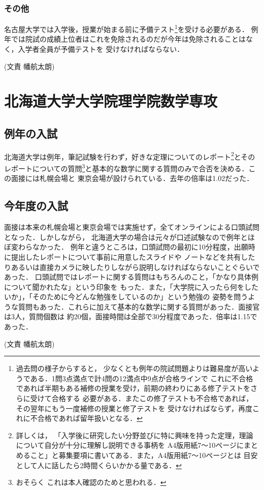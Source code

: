 \documentclass[uplatex]{jsarticle}
\begin{document}
	\subsubsection*{その他}
  名古屋大学では入学後，授業が始まる前に予備テスト\footnote{過去問の様子からすると，
  少なくとも例年の院試問題よりは難易度が高いようである．1問3点満点で計4問の12満点中9点が合格ラインで
  これに不合格であれば半期もある補修の授業を受け，前期の終わりにある修了テストをさらに受けて合格する
  必要がある．またこの修了テストも不合格であれば，その翌年にもう一度補修の授業と修了テストを
  受けなければならず，再度これに不合格であれば留年扱いとなる．}を受ける必要がある．
  例年では院試の成績上位者はこれを免除されるのだが今年は免除されることはなく，入学者全員が予備テストを
  受けなければならない．
  \begin{flushright}
    (文責 幡航太朗)
	\end{flushright}
	
	\newpage
	\section*{北海道大学大学院理学院数学専攻}
	\subsection*{例年の入試}
  北海道大学は例年，筆記試験を行わず，好きな定理についてのレポート\footnote{詳しくは，
  「入学後に研究したい分野並びに特に興味を持った定理，理論について自分が十分に理解し説明できる事柄を
  A4版用紙7～10ページにまとめること」と募集要項に書いてある．また，A4版用紙7～10ページとは
  目安として人に話したら2時間くらいかかる量である．}とそのレポートについての質問\footnote{おそらく
  これは本人確認のためと思われる．}と基本的な数学に関する質問のみで合否を決める．この面接には札幌会場と
  東京会場が設けられている．去年の倍率は1.02だった．
	\subsection*{今年度の入試}
  面接は本来の札幌会場と東京会場では実施せず，全てオンラインによる口頭試問となった．しかしながら，
  北海道大学の場合は元々が口述試験なので例年とほぼ変わらなかった．
  例年と違うところは，口頭試問の最初に10分程度，出願時に提出したレポートについて事前に用意したスライドや
  ノートなどを共有したりあるいは直接カメラに映したりしながら説明しなければならないことぐらいであった．
  口頭試問ではレポートに関する質問はもちろんのこと，「かなり具体例について聞かれたな」という印象を
  もった．また，「大学院に入ったら何をしたいか」，「そのために今どんな勉強をしているのか」という勉強の
  姿勢を問うような質問もあった．これらに加えて基本的な数学に関する質問があった．面接官は3人，質問個数は
  約20個，面接時間は全部で30分程度であった．倍率は1.15であった．
  \begin{flushright}
    (文責 幡航太朗)
	\end{flushright}
	
\end{document}
